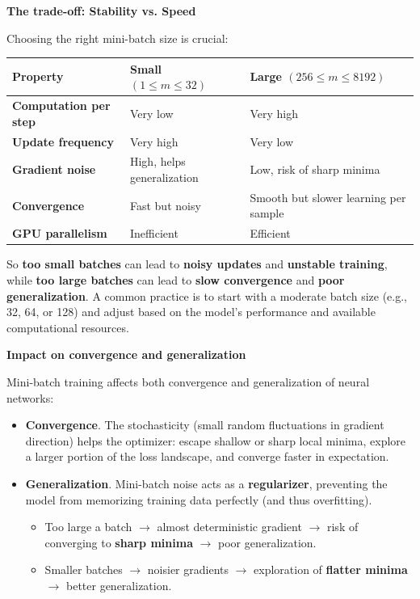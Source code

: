 \highspace
\begin{flushleft}
    \textcolor{Green3}{ \textbf{The trade-off: Stability vs. Speed}}
\end{flushleft}
Choosing the right mini-batch size is crucial:
\begin{table}[!htp]
    \centering
    \begin{tabular}{@{} p{9em} p{10em} p{12em} @{}}
        \toprule
        Property & Small $(1 \leq m \leq 32)$ & Large $(256 \leq m \leq 8192)$ \\
        \midrule
        \textbf{Computation per step}   & Very low & Very high \\[.5em]
        \textbf{Update frequency}       & Very high & Very low \\[.5em]
        \textbf{Gradient noise}         & High, helps generalization & Low, risk of sharp minima \\[.5em]
        \textbf{Convergence}            & Fast but noisy & Smooth but slower learning per sample \\[.5em]
        \textbf{GPU parallelism}        & Inefficient & Efficient \\
        \bottomrule
    \end{tabular}
\end{table}

\noindent
So \textbf{too small batches} can lead to \textbf{noisy updates} and \textbf{unstable training}, while \textbf{too large batches} can lead to \textbf{slow convergence} and \textbf{poor generalization}. A common practice is to start with a moderate batch size (e.g., 32, 64, or 128) and adjust based on the model's performance and available computational resources.

\newpage

\begin{flushleft}
    \textcolor{Green3}{ \textbf{Impact on convergence and generalization}}
\end{flushleft}
Mini-batch training affects both convergence and generalization of neural networks:
\begin{itemize}
    \item \textbf{Convergence}. The stochasticity (small random fluctuations in gradient direction) helps the optimizer: escape shallow or sharp local minima, explore a larger portion of the loss landscape, and converge faster in expectation.
    \item \textbf{Generalization}. Mini-batch noise acts as a \textbf{regularizer}, preventing the model from memorizing training data perfectly (and thus overfitting).
    \begin{itemize}
        \item Too large a batch $\to$ almost deterministic gradient $\to$ risk of converging to \textbf{sharp minima} $\to$ poor generalization.
        \item Smaller batches $\to$ noisier gradients $\to$ exploration of \textbf{flatter minima} $\to$ better generalization.
    \end{itemize}
\end{itemize}